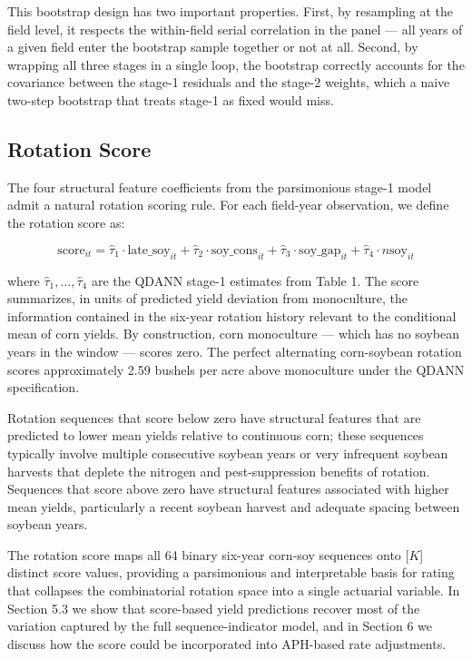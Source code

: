 \documentclass[11pt,letterpaper]{article}
\theoremstyle{remark}
\theoremstyle{plain}
\theoremstyle{definition}
\begin{document}
This bootstrap design has two important properties. First, by resampling at the field level, it respects the within-field serial correlation in the panel — all years of a given field enter the bootstrap sample together or not at all. Second, by wrapping all
three stages in a single loop, the bootstrap correctly accounts for the covariance between the stage-1 residuals and the stage-2 weights, which a naive two-step bootstrap that treats stage-1 as fixed would miss.

\subsection{\label{subsec:rot_score}Rotation Score}
The four structural feature coefficients from the parsimonious stage-1 model admit a natural rotation scoring rule. For each field-year observation, we define the rotation score as:

\begin{equation}
    \text{score}_{it} = \hat{\tau}_1 \cdot \text{late\_soy}_{it} + \hat{\tau}_2 \cdot \text{soy\_cons}_{it} + \hat{\tau}_3 \cdot \text{soy\_gap}_{it} + \hat{\tau}_4 \cdot n\text{soy}_{it}
\end{equation}

where $\hat{\tau}_1, \ldots, \hat{\tau}_4$ are the QDANN stage-1 estimates from Table 1. The score summarizes, in units of predicted yield deviation from monoculture, the information contained in the six-year rotation history relevant to the conditional mean of corn yields. By construction, corn monoculture — which has no soybean years in the window — scores zero. The perfect alternating corn-soybean rotation scores approximately 2.59 bushels per acre above monoculture under the QDANN specification.

Rotation sequences that score below zero have structural features that are predicted to lower mean yields relative to continuous corn; these sequences typically involve multiple consecutive soybean years or very infrequent soybean harvests that deplete
the nitrogen and pest-suppression benefits of rotation. Sequences that score above zero have structural features associated with higher mean yields, particularly a recent soybean harvest and adequate spacing between soybean years.

The rotation score maps all 64 binary six-year corn-soy sequences onto [$K$] distinct score values, providing a parsimonious and interpretable basis for rating that collapses the combinatorial rotation space into a single actuarial variable. In Section 5.3 we
show that score-based yield predictions recover most of the variation captured by the full sequence-indicator model, and in Section 6 we discuss how the score could be incorporated into APH-based rate adjustments.
\end{document}
